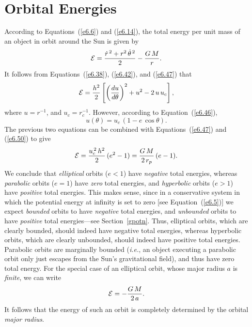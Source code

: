 \section{Orbital Energies}
According to Equations~(\ref{e6.6}) and (\ref{e6.14}), the total energy per unit mass
of an object in orbit around the Sun is
given by
\begin{equation}\label{e6.54}
{\cal E} = \frac {\dot{r}^{\,2} + r^2\,\dot{\theta}^{\,2}}{2} - \frac{G\,M}{r}.
\end{equation}
It follows from Equations~(\ref{e6.38}), (\ref{e6.42}), and (\ref{e6.47}) that
\begin{equation}\label{e6.55}
{\cal E} = \frac{h^2}{2}\left[\left(\frac{du}{d\theta}\right)^2
+ u^2 - 2\,u\,u_c\right],
\end{equation}
where $u=r^{-1}$, and $u_c = r_c^{-1}$. However, according to Equation~(\ref{e6.46}),
\begin{equation}
u(\theta) = u_c\,(1-e\,\cos\theta).
\end{equation}
The previous two equations can be combined with Equations~(\ref{e6.47})
and (\ref{e6.50}) to give
\begin{equation}\label{e6.57}
{\cal E} = \frac{u_c^{\,2}\,h^2}{2}\, (e^2 -1) = \frac{G\,M}{2\,r_p}\,(e-1).
\end{equation}
We conclude that {\em elliptical}\/ orbits ($e<1$) have {\em negative}\/ total energies,
whereas {\em parabolic}\/ orbits ($e=1$) have {\em zero}\/ total energies,
and {\em hyperbolic}\/ orbits ($e>1$) have {\em positive}\/ total energies. This
makes sense, since in a conservative system in which the potential
energy at infinity is set to zero [see Equation~(\ref{e6.5})] we expect {\em bounded}\/ orbits to have {\em negative}\/ total energies, and {\em unbounded}\/ orbits to have {\em positive}\/
total energies---see Section~\ref{gpotn}. Thus, elliptical orbits, which are clearly bounded, should indeed have
negative total energies, whereas hyperbolic orbits, which are clearly
unbounded, should indeed have positive total energies. Parabolic orbits
are marginally bounded ({\em i.e.}, an object executing a parabolic orbit only just escapes from the Sun's gravitational field), and thus have zero total energy. For the special case of an elliptical orbit, whose major radius $a$ is {\em finite}, we can write
\begin{equation}
{\cal E} = - \frac{G\,M}{2\,a}.
\end{equation}
It follows that the energy of such an orbit is completely determined by the orbital {\em major radius}.

